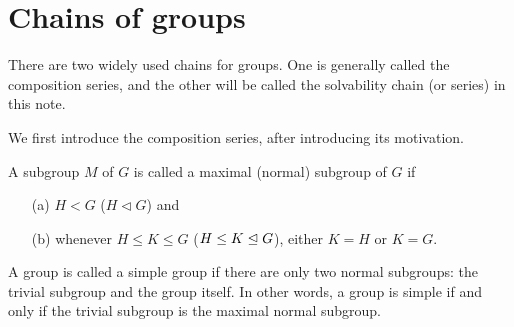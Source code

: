 \section{Chains of groups}

There are two widely used chains for groups.
One is generally called the composition series, and the other will be called the solvability chain (or series) in this note.

We first introduce the composition series, after introducing its motivation.
\begin{defi}
    A subgroup $M$ of $G$ is called a maximal (normal) subgroup of $G$ if
    \begin{enumerate}
        \item[(a)]
        {
            $H<G$ ($H\triangleleft G$) and
        }
        \item[(b)]
        {
            whenever $H\leq K\leq G$ ($H\leq K\trianglelefteq G$), either $K=H$ or $K=G$.
        }
    \end{enumerate}
\end{defi}
\begin{defi}
    A group is called a simple group if there are only two normal subgroups: the trivial subgroup and the group itself.
    In other words, a group is simple if and only if the trivial subgroup is the maximal normal subgroup.
\end{defi}


